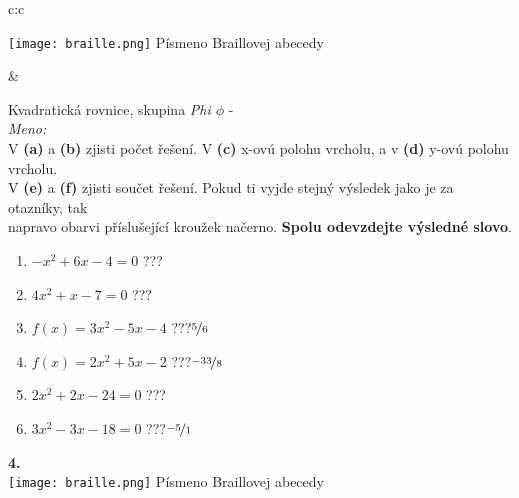 \documentclass[10pt]{report}
\begin{document}
\begin{tabular}{c:c}
\begin{minipage}[c][99mm][t]{0.49\linewidth}
\begin{center}
\begin{minipage}{0.20\linewidth}
\begin{center}
\texttt{[image: braille.png]}
{\small Písmeno Braillovej abecedy}
\end{center}
\end{minipage}
\end{center}
\end{minipage}
&
\begin{minipage}[c][99mm][t]{0.49\linewidth}
\begin{center}
\vspace{7mm}
{\huge Kvadratická rovnice, skupina \textit{Phi $\phi$} -}\\[4.5mm]
\textit{Meno:}\phantom{xxxxxxxxxxxxxxxxxxxxxxxxxxxxxxxxxxxxxxxxxxxxxxxxxxxxxxxxxxxxxxxxx}\\[3.5mm]
V \textbf{(a)} a \textbf{(b)} zjisti počet řešení. V \textbf{(c)} x-ovú polohu vrcholu, a v \textbf{(d)} y-ovú polohu vrcholu.\\V \textbf{(e)} a \textbf{(f)} zjisti součet řešení. Pokud ti vyjde stejný výsledek jako je za otazníky, tak\\napravo obarvi příslušející kroužek načerno. \textbf{Spolu odevzdejte výsledné slovo}.\\[3mm]
\begin{minipage}{0.77\linewidth}
\begin{center}
\begin{varwidth}{\textwidth}
\begin{enumerate}
\large
\item $-x^2+6x-4=0$\quad \dotfill\; ???\;\dotfill {}
\item $4x^2+x-7=0$\quad \dotfill\; ???\;\dotfill {}
\item $f(x)=3x^2-5x-4$\quad \dotfill\; ???\;\dotfill \quad $\nicefrac{5}{6}$
\item $f(x)=2x^2+5x-2$\quad \dotfill\; ???\;\dotfill \quad $\nicefrac{-33}{8}$
\item $2x^2+2x-24=0$\quad \dotfill\; ???\;\dotfill {}
\item $3x^2-3x-18=0$\quad \dotfill\; ???\;\dotfill \quad $\nicefrac{-5}{1}$
\end{enumerate}
\end{varwidth}
\end{center}
\end{minipage}
\begin{minipage}{0.20\linewidth}
\begin{center}
{\Huge\bfseries 4.} \\[2mm]
\texttt{[image: braille.png]}
{\small Písmeno Braillovej abecedy}
\end{center}
\end{minipage}
\end{center}
\end{minipage}

\end{tabular}
\end{document}
